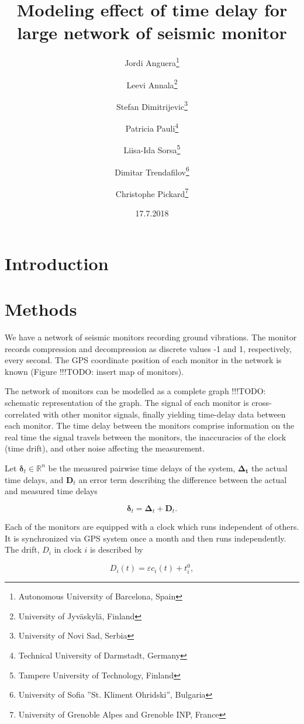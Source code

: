 \documentclass[12pt,a4paper,english]{article}
\author{Jordi Anguera\thanks{Autonomous University of Barcelona, Spain} \and Leevi Annala\thanks{University of Jyväskylä, Finland} \and Stefan Dimitrijevic\thanks{University of Novi Sad, Serbia} \and Patricia Pauli\thanks{Technical University of Darmstadt, Germany} \and Liisa-Ida Sorsa\thanks{Tampere University of Technology, Finland} \and Dimitar Trendafilov\thanks{University of Sofia ''St. Kliment Ohridski'', Bulgaria} \and Christophe Pickard\thanks{University of Grenoble Alpes and Grenoble INP, France}}
\title{Modeling effect of time delay for large network of seismic monitor}
\date{17.7.2018}
\newcommand\todo[1]{{\color{red}!!!TODO: #1}}
\begin{document}
\maketitle

\begin{abstract}

\end{abstract}

\section{Introduction}

\section{Methods}

We have a network of seismic monitors recording ground vibrations. The monitor records compression and decompression as discrete values -1 and 1, respectively, every second. The GPS coordinate position of each monitor in the network is known (Figure \todo{insert map of monitors}). 

The network of monitors can be modelled as a complete graph \todo{schematic representation of the graph}. The signal of each monitor is cross-correlated with other monitor signals, finally yielding time-delay data between each monitor. The time delay between the monitors comprise information on the real time the signal travels between the monitors, the inaccuracies of the clock (time drift), and other noise affecting the measurement. 

Let $\bm{\delta}_t \in \mathbb{R}^{n}$ be the measured pairwise time delays of the system, $\bm{\Delta_t}$ the actual time delays, and $\mathbf{D}_t$ an error term describing the difference between the actual and measured time delays 

\begin{equation}
\bm{\delta}_t  = \bm{\Delta}_t + \mathbf{D}_t.
\label{eq:model}
\end{equation}
 
Each of the monitors are equipped with a clock which runs independent of others. It is synchronized via GPS system once a month and then runs independently. The drift, $D_i$ in clock $i$ is described by 

\begin{equation}
D_i(t) = \varepsilon c_i(t) + t_i^0,
\label{eq:driftone}
\end{equation}
\end{document}
